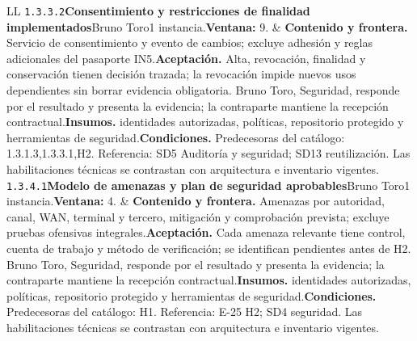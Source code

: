 \begin{longtable}{L{\tabcolsep\relax}L{\tabcolsep\relax}}
\texttt{1.\allowbreak{}3.\allowbreak{}3.\allowbreak{}2}\newline{}\textbf{Consentimiento y restricciones de finalidad implementados}\newline{}Bruno Toro\newline{}1 instancia.\newline{}\textbf{Ventana:} 9. & \textbf{Contenido y frontera.} Servicio de consentimiento y evento de cambios; excluye adhesión y reglas adicionales del pasaporte IN5.\newline{}\textbf{Aceptación.} Alta, revocación, finalidad y conservación tienen decisión trazada; la revocación impide nuevos usos dependientes sin borrar evidencia obligatoria. Bruno Toro, Seguridad, responde por el resultado y presenta la evidencia; la contraparte mantiene la recepción contractual.\newline{}\textbf{Insumos.} identidades autorizadas, políticas, repositorio protegido y herramientas de seguridad.\newline{}\textbf{Condiciones.} Predecesoras del catálogo: 1.3.1.3,1.3.3.1,H2. Referencia: SD5 Auditoría y seguridad; SD13 reutilización. Las habilitaciones técnicas se contrastan con arquitectura e inventario vigentes.\\\hline
\texttt{1.\allowbreak{}3.\allowbreak{}4.\allowbreak{}1}\newline{}\textbf{Modelo de amenazas y plan de seguridad aprobables}\newline{}Bruno Toro\newline{}1 instancia.\newline{}\textbf{Ventana:} 4. & \textbf{Contenido y frontera.} Amenazas por autoridad, canal, WAN, terminal y tercero, mitigación y comprobación prevista; excluye pruebas ofensivas integrales.\newline{}\textbf{Aceptación.} Cada amenaza relevante tiene control, cuenta de trabajo y método de verificación; se identifican pendientes antes de H2. Bruno Toro, Seguridad, responde por el resultado y presenta la evidencia; la contraparte mantiene la recepción contractual.\newline{}\textbf{Insumos.} identidades autorizadas, políticas, repositorio protegido y herramientas de seguridad.\newline{}\textbf{Condiciones.} Predecesoras del catálogo: H1. Referencia: E-25 H2; SD4 seguridad. Las habilitaciones técnicas se contrastan con arquitectura e inventario vigentes.\\\hline

\end{longtable}
